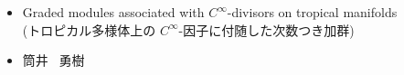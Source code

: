 \documentclass[uplatex,dvipdfmx,12pt]{jsarticle}
\begin{document}
\begin{titlepage}


\fontsize{20pt}{0cm}\selectfont

\begin{center}
\end{center}

\vspace{3cm}

\fontsize{14pt}{14pt}\selectfont

\begin{itemize}
\setlength{\leftskip}{34pt}
\item[{\textmc{論文題目}\quad}] Graded modules associated 
with $C^{\infty}$-divisors on tropical manifolds \\
(トロピカル多様体上の
$C^{\infty}$-因子に付随した次数つき加群)
\end{itemize}

\vspace{3cm}

\begin{itemize}
\setlength{\leftskip}{34pt}
\item[{\textmc{氏 \quad 名 }\quad}]  筒井 \, 勇樹
\end{itemize}

\end{titlepage}
\end{document}
